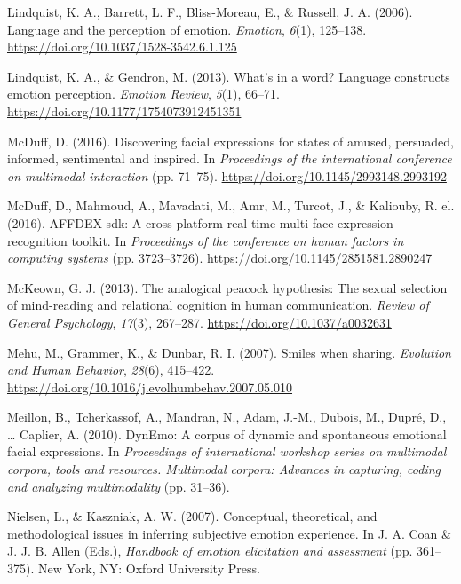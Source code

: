 \documentclass[
  english,
  doc]{apa7}
\newlength{\cslhangindent}
\newenvironment{cslreferences}%
  {\setlength{\parindent}{0pt}%
  \everypar{\setlength{\hangindent}{\cslhangindent}}\ignorespaces}%
  {\par}
\begin{document}
\begin{cslreferences}
\leavevmode\hypertarget{ref-lindquist2006language}{}%
Lindquist, K. A., Barrett, L. F., Bliss-Moreau, E., \& Russell, J. A. (2006). Language and the perception of emotion. \emph{Emotion}, \emph{6}(1), 125--138. \url{https://doi.org/10.1037/1528-3542.6.1.125}

\leavevmode\hypertarget{ref-lindquist2013s}{}%
Lindquist, K. A., \& Gendron, M. (2013). What's in a word? Language constructs emotion perception. \emph{Emotion Review}, \emph{5}(1), 66--71. \url{https://doi.org/10.1177/1754073912451351}

\leavevmode\hypertarget{ref-mcduff2016discovering}{}%
McDuff, D. (2016). Discovering facial expressions for states of amused, persuaded, informed, sentimental and inspired. In \emph{Proceedings of the international conference on multimodal interaction} (pp. 71--75). \url{https://doi.org/10.1145/2993148.2993192}

\leavevmode\hypertarget{ref-mcduff2016affdex}{}%
McDuff, D., Mahmoud, A., Mavadati, M., Amr, M., Turcot, J., \& Kaliouby, R. el. (2016). AFFDEX sdk: A cross-platform real-time multi-face expression recognition toolkit. In \emph{Proceedings of the conference on human factors in computing systems} (pp. 3723--3726). \url{https://doi.org/10.1145/2851581.2890247}

\leavevmode\hypertarget{ref-mckeown2013analogical}{}%
McKeown, G. J. (2013). The analogical peacock hypothesis: The sexual selection of mind-reading and relational cognition in human communication. \emph{Review of General Psychology}, \emph{17}(3), 267--287. \url{https://doi.org/10.1037/a0032631}

\leavevmode\hypertarget{ref-mehu2007smiles}{}%
Mehu, M., Grammer, K., \& Dunbar, R. I. (2007). Smiles when sharing. \emph{Evolution and Human Behavior}, \emph{28}(6), 415--422. \url{https://doi.org/10.1016/j.evolhumbehav.2007.05.010}

\leavevmode\hypertarget{ref-meillon2010dynemo}{}%
Meillon, B., Tcherkassof, A., Mandran, N., Adam, J.-M., Dubois, M., Dupré, D., \ldots{} Caplier, A. (2010). DynEmo: A corpus of dynamic and spontaneous emotional facial expressions. In \emph{Proceedings of international workshop series on multimodal corpora, tools and resources. Multimodal corpora: Advances in capturing, coding and analyzing multimodality} (pp. 31--36).

\leavevmode\hypertarget{ref-nielsen2007conceptual}{}%
Nielsen, L., \& Kaszniak, A. W. (2007). Conceptual, theoretical, and methodological issues in inferring subjective emotion experience. In J. A. Coan \& J. J. B. Allen (Eds.), \emph{Handbook of emotion elicitation and assessment} (pp. 361--375). New York, NY: Oxford University Press.


\end{cslreferences}
\end{document}
